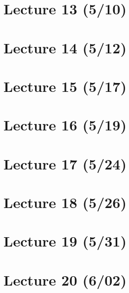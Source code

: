 \section{Lecture 13 (5/10)}

\newpage

\section{Lecture 14 (5/12)}

\newpage

\section{Lecture 15 (5/17)}

\newpage

\section{Lecture 16 (5/19)}

\newpage

\section{Lecture 17 (5/24)}

\newpage

\section{Lecture 18 (5/26)}

\newpage

\section{Lecture 19 (5/31)}

\newpage

\section{Lecture 20 (6/02)}

\newpage

